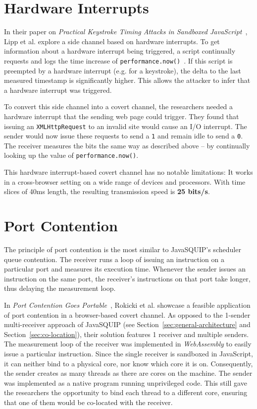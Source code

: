 \documentclass[11pt,
  titlepage=false,
]{scrreprt}
\begin{document}
\section{Hardware Interrupts}
In their paper on \textit{Practical Keystroke Timing Attacks in Sandboxed JavaScript}~\cite{lipp2017practical},
Lipp et al. explore a side channel based on hardware interrupts.
To get information about a hardware interrupt being triggered,
a script continually requests and logs the time increase of \texttt{performance.now()}~\cite{performancenow}.
If this script is preempted by a hardware interrupt (e.g. for a keystroke),
the delta to the last measured timestamp is significantly higher.
This allows the attacker to infer that a hardware interrupt was triggered.

To convert this side channel into a covert channel,
the researchers needed a hardware interrupt that the sending web page could trigger.
They found that issuing an \texttt{XMLHttpRequest} to an invalid site would cause an I/O interrupt.
The sender would now issue these requests to send a \texttt{1} and remain idle to send a \texttt{0}.
The receiver measures the bits the same way as described above --
by continually looking up the value of \texttt{performance.now()}.

This hardware interrupt-based covert channel has no notable limitations:
It works in a cross-browser setting on a wide range of devices and processors.
With time slices of 40ms length, the resulting transmission speed is \textbf{25 bits/s}.

\section{Port Contention}
The principle of port contention is the most similar to JavaSQUIP's scheduler queue contention.
The receiver runs a loop of issuing an instruction on a particular port and measures its execution time.
Whenever the sender issues an instruction on the same port, the receiver's instructions on that port take longer,
thus delaying the measurement loop.

In \textit{Port Contention Goes Portable}~\cite{Rokicki2022webport},
Rokicki et al. showcase a feasible application of port contention in a browser-based covert channel.
As opposed to the 1-sender multi-receiver approach of JavaSQUIP (see Section~\ref{sec:general-architecture} and Section~\ref{sec:co-location}),
their solution features 1 receiver and multiple senders.
The measurement loop of the receiver was implemented in \textit{WebAssembly} to easily issue a particular instruction.
Since the single receiver is sandboxed in JavaScript, it can neither bind to a physical core, nor know which core it is on.
Consequently, the sender creates as many threads as there are cores on the machine.
The sender was implemented as a native program running unprivileged code.
This still gave the researchers the opportunity to bind each thread to a different core,
ensuring that one of them would be co-located with the receiver.
\end{document}
